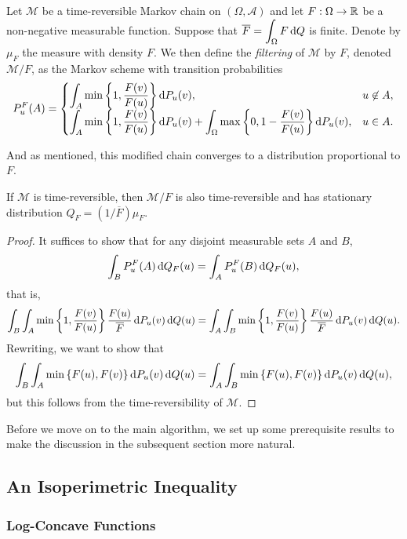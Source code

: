 \begin{fdef}
	\label{def: metropolis chain}
	Let $\mathcal{M}$ be a time-reversible Markov chain on $(\Omega,\mathcal{A})$ and let $F:\Omega\to\mathbb{R}$ be a non-negative measurable function. Suppose that $\overline{F} = \displaystyle\int_\Omega F\operatorname{d}\!{Q}$ is finite. Denote by $\mu_F$ the measure with density $F$. We then define the \textit{filtering} of $\mathcal{M}$ by $F$, denoted $\mathcal{M}/F$, as the Markov scheme with transition probabilities
	\[
		P_u^F(A) = 
		\begin{cases}
			\displaystyle\int_A \min\left\{1,\frac{F(v)}{F(u)}\right\}\operatorname{d}\!{P}_u(v), & u\not\in A, \\
			\displaystyle\int_A \min\left\{1,\frac{F(v)}{F(u)}\right\}\operatorname{d}\!{P}_u(v) + \int_{\Omega} \max\left\{0,1-\frac{F(v)}{F(u)}\right\}\operatorname{d}\!{P}_u(v),  & u\in A.
		\end{cases}
	\]
\end{fdef}

And as mentioned, this modified chain converges to a distribution proportional to $F$.

\begin{theorem}
	If $\mathcal{M}$ is time-reversible, then $\mathcal{M}/F$ is also time-reversible and has stationary distribution $Q_F = (1/\overline{F})\mu_F$.
\end{theorem}
\begin{proof}
	It suffices to show that for any disjoint measurable sets $A$ and $B$,
	\[ \int_B P_u^F(A)\operatorname{d}\!{Q}_F(u) = \int_A P_u^F(B) \operatorname{d}\!{Q}_F(u), \]
	that is,
	\[ \int_B \int_A \min\left\{1,\frac{F(v)}{F(u)}\right\} \frac{F(u)}{\overline{F}} \operatorname{d}\!{P}_u(v) \operatorname{d}\!{Q}(u) = \int_A \int_B \min\left\{1,\frac{F(v)}{F(u)}\right\} \frac{F(u)}{\overline{F}} \operatorname{d}\!{P}_u(v) \operatorname{d}\!{Q}(u). \]
	Rewriting, we want to show that
	\[ \int_B \int_A \min\left\{F(u),F(v)\right\} \operatorname{d}\!{P}_u(v) \operatorname{d}\!{Q}(u) = \int_A \int_B \min\left\{F(u),F(v)\right\} \operatorname{d}\!{P}_u(v) \operatorname{d}\!{Q}(u), \]
	but this follows from the time-reversibility of $\mathcal{M}$.
\end{proof}

Before we move on to the main algorithm, we set up some prerequisite results to make the discussion in the subsequent section more natural.


\subsection{An Isoperimetric Inequality}

\subsubsection{Log-Concave Functions}

